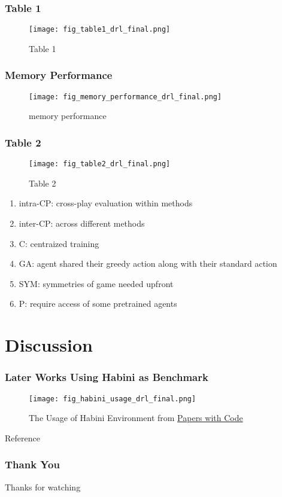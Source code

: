 \documentclass{njupre/njupre}
\begin{document}
\begin{frame}
    \frametitle{Table 1}
    \begin{figure}
        \texttt{[image: fig\_table1\_drl\_final.png]}
        \caption[short]{Table 1}
    \end{figure}
\end{frame}

\begin{frame}
    \frametitle{Memory Performance}
    \begin{figure}
        \texttt{[image: fig\_memory\_performance\_drl\_final.png]}
        \caption[short]{memory performance}
    \end{figure}

\end{frame}


\begin{frame}
    \frametitle{Table 2}
    \begin{figure}
        \texttt{[image: fig\_table2\_drl\_final.png]}
        \caption[short]{Table 2}
    \end{figure}
    \begin{enumerate}
        \item intra-CP: cross-play evaluation within methods
        \item inter-CP: across different methods
        \item C: centraized training
        \item GA: agent shared their greedy action along with their standard action
        \item SYM: symmetries of game needed upfront
        \item P: require access of some pretrained agents
    \end{enumerate}
\end{frame}

\section{Discussion}

\begin{frame}
    \frametitle{Later Works Using Habini as Benchmark}
    \begin{figure}
        \texttt{[image: fig\_habini\_usage\_drl\_final.png]}
        \caption[short]{The Usage of Habini Environment from \href{https://paperswithcode.com/task/hanabi}{Papers with Code}}
    \end{figure}
\end{frame}

\begin{frame}[allowframebreaks]{Reference}
    
    
\end{frame}


\begin{frame}
    \frametitle{Thank You}
    Thanks for watching
\end{frame}
\end{document}
